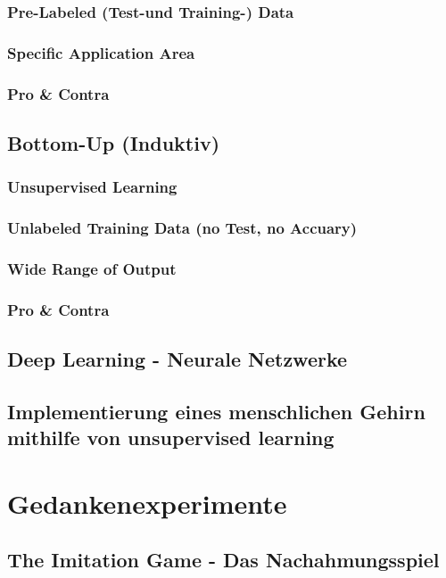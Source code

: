\documentclass[12pt,german,ngerman]{report}
\begin{document}
        \subsection{Pre-Labeled (Test-und Training-) Data}
        \subsection{Specific Application Area}
        \subsection{Pro \& Contra}
        
    \section{Bottom-Up (Induktiv)}
        \subsection{Unsupervised Learning}
        \subsection{Unlabeled Training Data (no Test, no Accuary)}
        \subsection{Wide Range of Output}
        \subsection{Pro \& Contra}

    \section{Deep Learning - Neurale Netzwerke}
        \section{Implementierung eines menschlichen Gehirn mithilfe von unsupervised learning}

\chapter{Gedankenexperimente}
    \section{The Imitation Game - Das Nachahmungsspiel}
\end{document}
